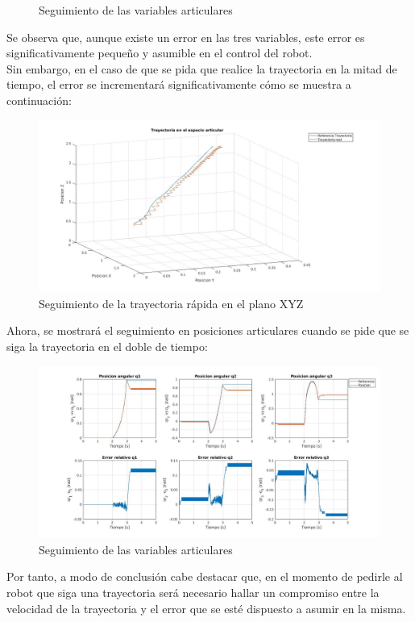 \begin{itemize}
\begin{figure}[h!]
		\caption{Seguimiento de las variables articulares}

	\end{figure}

	\newpage
	Se observa que, aunque existe un error en las tres variables, este error es significativamente pequeño y asumible en el control del robot.\\
	Sin embargo, en el caso de que se pida que realice la trayectoria en la mitad de tiempo, el error se incrementará significativamente cómo se muestra a continuación:



	\begin{figure}[h!]
		\centering
		\includegraphics[width=.8\textwidth]{exp4_trayPDidealSR_rapido}
		\caption{Seguimiento de la trayectoria rápida en el plano XYZ}
	\end{figure}

	Ahora, se mostrará el seguimiento en posiciones articulares cuando se pide que se siga la trayectoria en el doble de tiempo:

	\begin{figure}[h!]
		\centering
		\includegraphics[width=.8\textwidth]{exp4_posPDidealSR_rapido}
		\caption{Seguimiento de las variables articulares}
	\end{figure}
	Por tanto, a modo de conclusión cabe destacar que, en el momento de pedirle al robot que siga una trayectoria será necesario hallar un compromiso entre la velocidad de la trayectoria y el error que se esté dispuesto a asumir en la misma.\\


\end{itemize}
